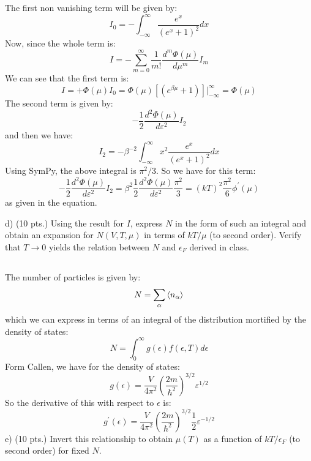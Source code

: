 \documentclass[12pt]{article}
\begin{document}
\subsection{}
The first non vanishing term will be given by:
\begin{equation}
  I_0 = -\int_{-\infty}^{\infty} \frac{e^{x}}{\left(e^{x} + 1\right)^2} dx
\end{equation}
Now, since the whole term is:
\begin{equation}
  I = -\sum_{m=0}^{\infty} \frac{1}{m!}\frac{d^m\Phi(\mu)}{d\mu^m} I_m
\end{equation}
We can see that the first term is:
\begin{equation}
  I = +\Phi(\mu) I_0 = \Phi(\mu)\left[(e^{\beta \mu} + 1)\right]|_{-\infty}^{\infty} = \Phi(\mu)
\end{equation}
The second term is given by:
\begin{equation}
   - \frac{1}{2} \frac{d^2\Phi(\mu)}{d\varepsilon ^2} I_2
\end{equation}  
and then we have:
\begin{equation}
  I_{2} = -\beta^{-2} \int_{-\infty}^{\infty} x^2 \frac{e^{x}}{\left(e^{x} + 1\right)^2} dx
\end{equation}
Using SymPy, the above integral is $\pi^2/3$. So we have for this term: 
\begin{equation}
  - \frac{1}{2} \frac{d^2\Phi(\mu)}{d\varepsilon ^2} I_2 = \beta ^{2} \frac{1}{2} \frac{d^2\Phi(\mu)}{d\varepsilon ^2} \frac{\pi^2}{3} = (kT)^2 \frac{\pi^2}{6} \phi ^{\prime}(\mu)
\end{equation}
as given in the equation.

d) (10 pts.) Using the result for $I$, express $N$ in the form of such an integral and obtain an expansion for $N(V, T, \mu)$ in terms of $k T / \mu$ (to second order). Verify that $T \rightarrow 0$ yields the relation between $N$ and $\epsilon_{F}$ derived in class.
\subsection{}
The number of particles is given by:
\begin{equation}
  N = \sum_{\alpha } \expval{n_{\alpha}}
\end{equation}
which we can express in terms of an integral of the distribution mortified by the density of states:
\begin{equation}
  N = \int_{0}^{\infty} g(\epsilon) f(\epsilon, T) d\epsilon
\end{equation}
Form Callen, we have for the density of states:
\begin{equation}
  g(\epsilon) = \frac{V}{4 \pi^2}\left(\frac{2 m}{\hbar^2}\right)^{3 / 2} \varepsilon^{1 / 2}
\end{equation}
So the derivative of this with respect to $\epsilon$ is:
\begin{equation}
  g^{\prime}(\epsilon) = \frac{V}{4 \pi^2}\left(\frac{2 m}{\hbar^2}\right)^{3 / 2} \frac{1}{2} \varepsilon^{-1 / 2}
\end{equation}
e) (10 pts.) Invert this relationship to obtain $\mu(T)$ as a function of $k T / \epsilon_{F}$ (to second order) for fixed $N$.
\end{document}
